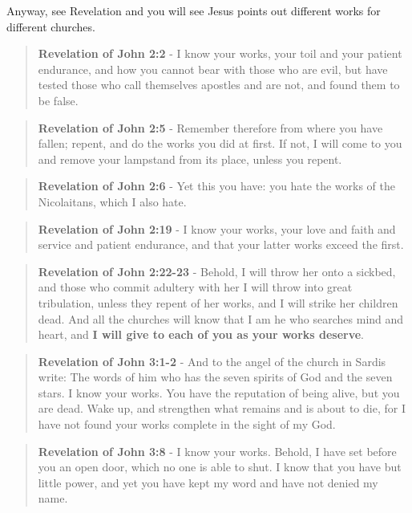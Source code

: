 \documentclass[11pt]{article}
\begin{document}
Anyway, see Revelation and you will see Jesus points out different works for different churches.

\begin{quote}
\textbf{Revelation of John 2:2} - I know your works, your toil and your patient endurance, and how you cannot bear with those who are evil, but have tested those who call themselves apostles and are not, and found them to be false.
\end{quote}

\begin{quote}
\textbf{Revelation of John 2:5} - Remember therefore from where you have fallen; repent, and do the works you did at first. If not, I will come to you and remove your lampstand from its place, unless you repent.
\end{quote}

\begin{quote}
\textbf{Revelation of John 2:6} - Yet this you have: you hate the works of the Nicolaitans, which I also hate.
\end{quote}

\begin{quote}
\textbf{Revelation of John 2:19} - I know your works, your love and faith and service and patient endurance, and that your latter works exceed the first.
\end{quote}

\begin{quote}
\textbf{Revelation of John 2:22-23} - Behold, I will throw her onto a sickbed, and those who commit adultery with her I will throw into great tribulation, unless they repent of her works, and I will strike her children dead. And all the churches will know that I am he who searches mind and heart, and \textbf{I will give to each of you as your works deserve}.
\end{quote}

\begin{quote}
\textbf{Revelation of John 3:1-2} - And to the angel of the church in Sardis write: The words of him who has the seven spirits of God and the seven stars. I know your works. You have the reputation of being alive, but you are dead. Wake up, and strengthen what remains and is about to die, for I have not found your works complete in the sight of my God.
\end{quote}

\begin{quote}
\textbf{Revelation of John 3:8} - I know your works. Behold, I have set before you an open door, which no one is able to shut. I know that you have but little power, and yet you have kept my word and have not denied my name.
\end{quote}
\end{document}
